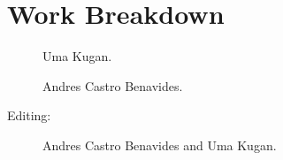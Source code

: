 \documentclass[sigconf]{acmart}
\begin{document}
	
	
	
	\newpage
	
	\appendix
	
	\section{Work Breakdown}
	
	\begin{description}
		
		\item[] Uma Kugan.
		
		\item[] Andres Castro Benavides.
		
		\item[Editing:] Andres Castro Benavides and Uma Kugan.
		
	\end{description}
	
\end{document}
